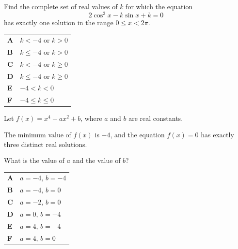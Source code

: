 \documentclass[11pt,a4paper]{article}
\begin{document}
\clearpage
\thispagestyle{djspaper}
\vspace*{8pt}
\begin{enumerate}[label=\textbf{\arabic*.},leftmargin=*,itemsep=0pt,start=17]
\questionitem[Trigonometry]
Find the complete set of real values of $k$ for which the equation
\[
2\cos^2 x - k\sin x + k = 0
\]
has exactly one solution in the range $0 \le x < 2\pi$.

\par\vspace*{12pt}
\begin{tabularx}{\linewidth}{@{}>{\bfseries}l Y@{}}
A &
$k < -4$ or $k > 0$
\\[0.8em]
B &
$k \le -4$ or $k > 0$
\\[0.8em]
C &
$k < -4$ or $k \ge 0$
\\[0.8em]
D &
$k \le -4$ or $k \ge 0$
\\[0.8em]
E &
$-4 < k < 0$
\\[0.8em]
F &
$-4 \le k \le 0$
\\
\end{tabularx}
\end{enumerate}
\clearpage
\thispagestyle{djspaper}
\vspace*{8pt}
\begin{enumerate}[label=\textbf{\arabic*.},leftmargin=*,itemsep=0pt,start=18]
\questionitem[Polynomials]
Let $f(x)=x^4+ax^2+b$, where $a$ and $b$ are real constants.

The minimum value of $f(x)$ is $-4$, and the equation $f(x)=0$ has exactly three distinct real solutions.

What is the value of $a$ and the value of $b$?

\par\vspace*{12pt}
\begin{tabularx}{\linewidth}{@{}>{\bfseries}l Y@{}}
A &
$a=-4,\,b=-4$
\\[0.8em]
B &
$a=-4,\,b=0$
\\[0.8em]
C &
$a=-2,\,b=0$
\\[0.8em]
D &
$a=0,\,b=-4$
\\[0.8em]
E &
$a=4,\,b=-4$
\\[0.8em]
F &
$a=4,\,b=0$
\\
\end{tabularx}
\end{enumerate}
\end{document}
